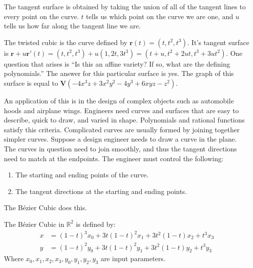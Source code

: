 \documentclass[crop=false,class=book,oneside]{standalone}
\begin{document}
                \begin{remark}
                    The tangent surface is obtained by
                    taking the union of all of the tangent
                    lines to every point on the curve.
                    $t$ tells us which point on the curve we are
                    one, and $u$ tells us how far along the
                    tangent line we are.
                \end{remark}
                \begin{example}
                    The twisted cubic is the curve defined by
                    $\mathbf{r}(t)=(t,t^2,t^3)$. It's tangent surface is
                    $\mathbf{r}+u\mathbf{r}'(t)%
                     =(t,t^2,t^3)+u(1,2t,3t^3)%
                     =(t+u,t^2+2ut,t^3+3ut^2)$.
                    One question that arises is
                    ``Is this an affine variety? If so,
                    what are the defining polynomials.''
                    The answer for this particular surface is yes.
                    The graph of this surface is equal to
                    $\mathbf{V}(-4x^3z+3x^2y^2-4y^3+6xyz-z^2)$.
                \end{example}
                An application of this is in the design of
                complex objects such as automobile hoods and
                airplane wings. Engineers need curves and surfaces
                that are easy to describe, quick to draw, and varied
                in shape. Polynomials and rational functions satisfy
                this criteria. Complicated curves are usually
                formed by joining together simpler curves. Suppose
                a design engineer needs to draw a curve in the plane.
                The curves in question need to join smoothly, and
                thus the tangent directions need to match at the
                endpoints. The engineer must control the following:
                \begin{enumerate}
                    \item The starting and ending
                          points of the curve.
                    \item The tangent directions
                          at the starting and ending points.
                \end{enumerate}
                The B\'{e}zier Cubic does this.
                \begin{definition}
                    The B\'{e}zier Cubic in $\mathbb{R}^2$
                    is defined by:
                    \begin{align*}
                        x&=(1-t)^{3}x_0
                          +3t(1-t)^2x_1
                          +3t^2(1-t)x_2+t^3x_3\\
                        y&=(1-t)^{2}y_0
                          +3t(1-t)^2y_1
                          +3t^2(1-t)y_2+t^3y_3
                    \end{align*}
                    Where $x_0,x_1,x_2,x_3,y_0,y_1,y_2,y_3$
                    are input parameters.
                \end{definition}
\end{document}
